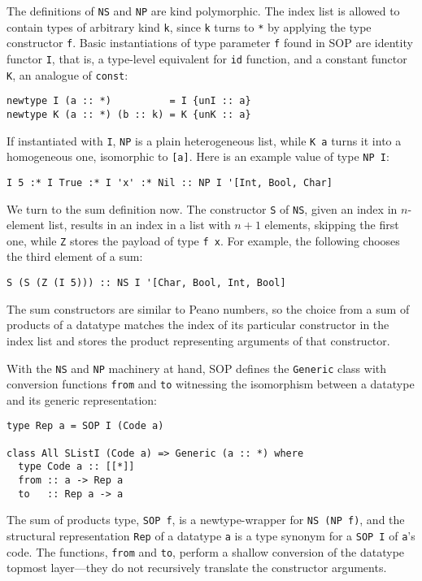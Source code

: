 \documentclass[runningheads]{llncs}
\newcommand{\K}[1]{\lstinline{#1}}
\begin{document}
The definitions of \K{NS} and \K{NP} are kind polymorphic. The index list is allowed to contain types of arbitrary kind \K{k}, since \K{k} turns to \K{*} by applying the type constructor \K{f}.
Basic instantiations of type parameter \K{f} found in SOP are identity functor \K{I}, that is, a type-level equivalent for \K{id} function, and a constant functor \K{K}, an analogue of \K{const}:
\begin{lstlisting}
newtype I (a :: *)          = I {unI :: a}
newtype K (a :: *) (b :: k) = K {unK :: a}
\end{lstlisting}
If instantiated with \K{I}, \K{NP} is a plain heterogeneous list, while \K{K a} turns it into a homogeneous one, isomorphic to \K{[a]}. Here is an example value of type \K{NP I}:
\begin{lstlisting}
I 5 :* I True :* I 'x' :* Nil :: NP I '[Int, Bool, Char]
\end{lstlisting}

We turn to the sum definition now. The constructor \K{S} of \K{NS}, given an index in $n$-element list, results in an index in a list with $n+1$ elements, skipping the first one, while \K{Z} stores the payload of type \K{f x}. For example, the following chooses the third element of a sum:
\begin{lstlisting}
S (S (Z (I 5))) :: NS I '[Char, Bool, Int, Bool]
\end{lstlisting}
The sum constructors are similar to Peano numbers, so the choice from a sum of products of a datatype matches the index of its particular constructor in the index list and stores the product representing arguments of that constructor.

With the \K{NS} and \K{NP} machinery at hand, SOP defines the \K{Generic} class with conversion functions \K{from} and \K{to} witnessing the isomorphism between a datatype and its generic representation:
\begin{lstlisting}
type Rep a = SOP I (Code a)

class All SListI (Code a) => Generic (a :: *) where
  type Code a :: [[*]]
  from :: a -> Rep a
  to   :: Rep a -> a
\end{lstlisting}
The sum of products type, \K{SOP f}, is a newtype-wrapper for \K{NS (NP f)}, and the structural representation \K{Rep} of a datatype \K{a} is a type synonym for a \K{SOP I} of \K{a}'s code. The functions, \K{from} and \K{to}, perform a shallow conversion of the datatype topmost layer---they do not recursively translate the constructor arguments.
\end{document}
